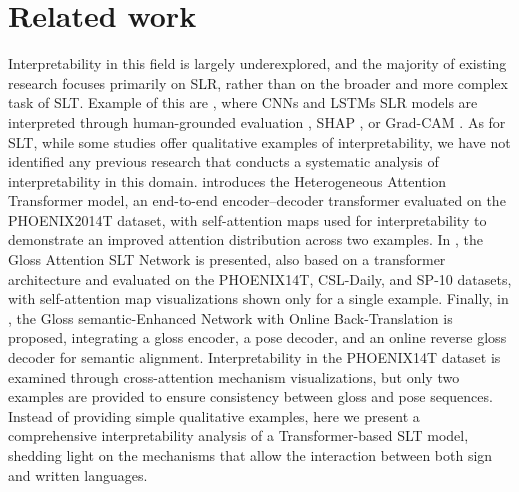 \section{Related work}


Interpretability in this field is largely underexplored, and the majority of existing research focuses primarily on SLR, rather than on the broader and more complex task of SLT. Example of this are \cite{moryossef2021evaluating,raihan2024bengali,hu2023self}, where CNNs and LSTMs SLR models are interpreted through human-grounded evaluation \cite{doshi2017towards}, SHAP \cite{lundberg2017unified}, or Grad-CAM \cite{selvaraju2017grad}. As for SLT, while some studies offer qualitative examples of interpretability, we have not identified any previous research that conducts a systematic analysis of interpretability in this domain. \cite{zhang2023heterogeneous} introduces the Heterogeneous Attention Transformer model, an end-to-end encoder–decoder transformer evaluated on the PHOENIX2014T dataset, with self-attention maps used for interpretability to demonstrate an improved attention distribution across two examples. In \cite{yin2023gloss}, the Gloss Attention SLT Network is presented, also based on a transformer architecture and evaluated on the PHOENIX14T, CSL-Daily, and SP-10 \cite{yin2022mlslt} datasets, with self-attention map visualizations shown only for a single example. Finally, in \cite{tang2022gloss}, the Gloss semantic-Enhanced Network with Online Back-Translation is proposed, integrating a gloss encoder, a pose decoder, and an online reverse gloss decoder for semantic alignment. Interpretability in the PHOENIX14T dataset is examined through cross-attention mechanism visualizations, but only two examples are provided to ensure consistency between gloss and pose sequences. Instead of providing simple qualitative examples, here we present a comprehensive interpretability analysis of a Transformer-based SLT model, shedding light on the mechanisms that allow the interaction between both sign and written languages.
